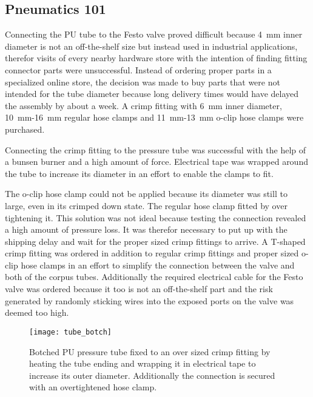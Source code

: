 \subsection{Pneumatics 101}
Connecting the PU tube to the Festo valve proved difficult because \SI{4}{\milli\meter} inner diameter is not an off-the-shelf size but instead used in industrial applications, therefor visits of every nearby hardware store with the intention of finding fitting connector parts were unsuccessful. Instead of ordering proper parts in a specialized online store, the decision was made to buy parts that were not intended for the tube diameter because long delivery times would have delayed the assembly by about a week. A crimp fitting with \SI{6}{\milli\meter} inner diameter, \SI{10}{\milli\meter}-\SI{16}{\milli\meter} regular hose clamps and \SI{11}{\milli\meter}-\SI{13}{\milli\meter} o-clip hose clamps were purchased. 

Connecting the crimp fitting to the pressure tube was successful with the help of a bunsen burner and a high amount of force. Electrical tape was wrapped around the tube to increase its diameter in an effort to enable the clamps to fit.

The o-clip hose clamp could not be applied because its diameter was still to large, even in its crimped down state. The regular hose clamp fitted by over tightening it. This solution was not ideal because testing the connection revealed a high amount of pressure loss. It was therefor necessary to put up with the shipping delay and wait for the proper sized crimp fittings to arrive. A T-shaped crimp fitting was ordered in addition to regular crimp fittings and proper sized o-clip hose clamps in an effort to simplify the connection between the valve and both of the corpus tubes. Additionally the required electrical cable for the Festo valve was ordered because it too is not an off-the-shelf part and the risk generated by randomly sticking wires into the exposed ports on the valve was deemed too high.

\begin{figure}[h]
\centering

\texttt{[image: tube\_botch]}

\caption{Botched PU pressure tube fixed to an over sized crimp fitting by heating the tube ending and wrapping it in electrical tape to increase its outer diameter. Additionally the connection is secured with an overtightened hose clamp.}
\end{figure}

